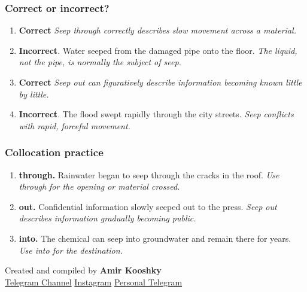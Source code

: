 \documentclass[11pt]{article}
\begin{document}
\subsubsection{Correct or incorrect?}
\begin{enumerate}
  \item \textbf{Correct} \emph{Seep through correctly describes slow movement across a material.}
  \item \textbf{Incorrect}. Water seeped from the damaged pipe onto the floor. \emph{The liquid, not the pipe, is normally the subject of seep.}
  \item \textbf{Correct} \emph{Seep out can figuratively describe information becoming known little by little.}
  \item \textbf{Incorrect}. The flood swept rapidly through the city streets. \emph{Seep conflicts with rapid, forceful movement.}
\end{enumerate}

\subsubsection{Collocation practice}
\begin{enumerate}
  \item \textbf{through.} Rainwater began to seep through the cracks in the roof. \emph{Use through for the opening or material crossed.}
  \item \textbf{out.} Confidential information slowly seeped out to the press. \emph{Seep out describes information gradually becoming public.}
  \item \textbf{into.} The chemical can seep into groundwater and remain there for years. \emph{Use into for the destination.}
\end{enumerate}

\vfill
\begin{center}
\small\color{Muted} Created and compiled by \textbf{Amir Kooshky}\\
\href{https://t.me/KooshkyTOEFL}{Telegram Channel}\quad\textbullet\quad
\href{https://www.instagram.com/kooshkytoefl}{Instagram}\quad\textbullet\quad
\href{https://t.me/KooshkyTOEFL\_pv}{Personal Telegram}
\end{center}
\end{document}
